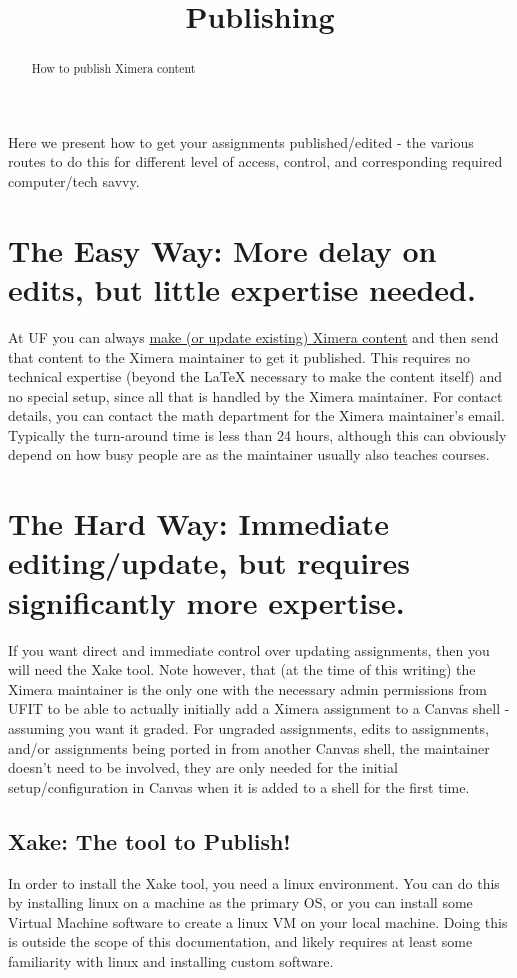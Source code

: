\documentclass{ximera}
\title{Publishing}
\begin{document}
\begin{abstract}
    How to publish Ximera content
\end{abstract}
\maketitle

Here we present how to get your assignments published/edited - the various routes to do this for different level of access, control, and corresponding required computer/tech savvy.

\section{The Easy Way: More delay on edits, but little expertise needed.}

    At UF you can always \href{https://xronos.clas.ufl.edu/examples/exampleCore/template/overleafTemplate}{make (or update existing) Ximera content} and then send that content to the Ximera maintainer to get it published. This requires no technical expertise (beyond the LaTeX necessary to make the content itself) and no special setup, since all that is handled by the Ximera maintainer. For contact details, you can contact the math department for the Ximera maintainer's email. Typically the turn-around time is less than 24 hours, although this can obviously depend on how busy people are as the maintainer usually also teaches courses.


\section{The Hard Way: Immediate editing/update, but requires significantly more expertise.}

    If you want direct and immediate control over updating assignments, then you will need the Xake tool. Note however, that (at the time of this writing) the Ximera maintainer is the only one with the necessary admin permissions from UFIT to be able to actually initially add a Ximera assignment to a Canvas shell - assuming you want it graded. For ungraded assignments, edits to assignments, and/or assignments being ported in from another Canvas shell, the maintainer doesn't need to be involved, they are only needed for the initial setup/configuration in Canvas when it is added to a shell for the first time.

    \subsection{Xake: The tool to Publish!}
        In order to install the Xake tool, you need a linux environment. You can do this by installing linux on a machine as the primary OS, or you can install some Virtual Machine software to create a linux VM on your local machine. Doing this is outside the scope of this documentation, and likely requires at least some familiarity with linux and installing custom software.
        
\end{document}
